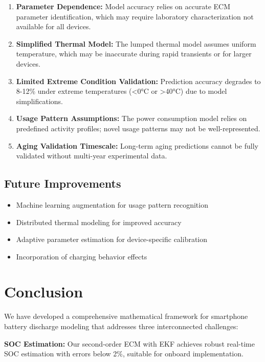 \begin{enumerate}
    \item \textbf{Parameter Dependence:} Model accuracy relies on accurate ECM parameter identification, which may require laboratory characterization not available for all devices.
    
    \item \textbf{Simplified Thermal Model:} The lumped thermal model assumes uniform temperature, which may be inaccurate during rapid transients or for larger devices.
    
    \item \textbf{Limited Extreme Condition Validation:} Prediction accuracy degrades to 8-12\% under extreme temperatures (<0°C or >40°C) due to model simplifications.
    
    \item \textbf{Usage Pattern Assumptions:} The power consumption model relies on predefined activity profiles; novel usage patterns may not be well-represented.
    
    \item \textbf{Aging Validation Timescale:} Long-term aging predictions cannot be fully validated without multi-year experimental data.
\end{enumerate}

\subsection{Future Improvements}

\begin{itemize}
    \item Machine learning augmentation for usage pattern recognition
    \item Distributed thermal modeling for improved accuracy
    \item Adaptive parameter estimation for device-specific calibration
    \item Incorporation of charging behavior effects
\end{itemize}

\section{Conclusion}

We have developed a comprehensive mathematical framework for smartphone battery discharge modeling that addresses three interconnected challenges:

\textbf{SOC Estimation:} Our second-order ECM with EKF achieves robust real-time SOC estimation with errors below 2\%, suitable for onboard implementation.

